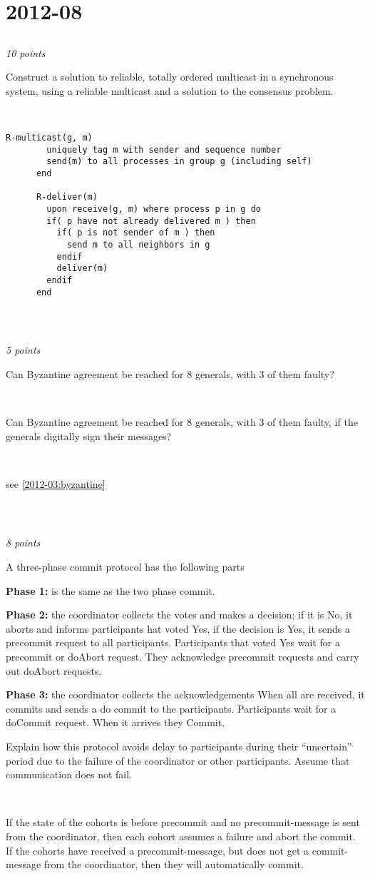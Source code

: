 \documentclass[a4paper]{article}
\newcommand{\points}[1]{\subsection{} \textit{#1 points}\\}
\newcommand{\question}[2][]{
  \parbox[t]{\textwidth}{
    \ifthenelse{\equal{#1}{}}{}{#1)}
    \parbox[t]{0.95\textwidth}{#2}}\\}
\newcommand{\solution}[2][]{
  \ifthenelse{\equal{#1}{} \or \equal{#1}{a}}{\\[3pt]\textit{Solution: }\\[0.1cm]}{}
  \parbox[t]{\textwidth}{
    \ifthenelse{\equal{#1}{}}{}{#1)}
    \parbox[t]{0.95\textwidth}{#2}}\\
}
\begin{document}
\section{2012-08}
\points{10}
\question{
  Construct a solution to reliable, totally ordered multicast
  in a synchronous system, using a reliable multicast and a solution
  to the consensus problem.
}
%
\begin{lrbox}{\userinput}
  \begin{minipage}{\linewidth}
    \begin{lstlisting}[mathescape]
      R-multicast(g, m)
        uniquely tag m with sender and sequence number
        send(m) to all processes in group g (including self)
      end

      R-deliver(m)
        upon receive(g, m) where process p in g do
        if( p have not already delivered m ) then
          if( p is not sender of m ) then
            send m to all neighbors in g
          endif
          deliver(m)
        endif
      end
    \end{lstlisting}
  \end{minipage}
\end{lrbox}
%
\solution{
  \usebox{\userinput}
}

\points{5}
\question[a]{
  Can Byzantine agreement be reached for 8 generals, with 3 of them
  faulty?
}
\question[b]{
  Can Byzantine agreement be reached for 8 generals, with 3 of them
  faulty, if the generals digitally sign their messages?
}
\solution{
  see \ref{2012-03:byzantine}
}

\points{8}
\question{
  A three-phase commit protocol has the following parts

  \textbf{Phase 1:} is the same as the two phase commit.

  \textbf{Phase 2:} the coordinator collects the votes and makes a
  decision; if it is No, it aborts and informs participants hat voted
  Yes, if the decision is Yes, it sends a precommit request to all
  participants. Participants that voted Yes wait for a precommit or
  doAbort request. They acknowledge precommit requests and carry out
  doAbort requests.

  \textbf{Phase 3:} the coordinator collects the acknowledgements When
  all are received, it commits and sends a do commit to the
  participants. Participants wait for a doCommit request. When it
  arrives they Commit.

  Explain how this protocol avoids delay to participants during their
  ``uncertain'' period due to the failure of the coordinator or other
  participants. Assume that communication does not fail.
}
\solution{
  If the state of the cohorts is before precommit and no
  precommit-message is sent from the coordinator, then each cohort
  assumes a failure and abort the commit. If the cohorts have received
  a precommit-message, but does not get a commit-message from the
  coordinator, then they will automatically commit.
}
\end{document}
